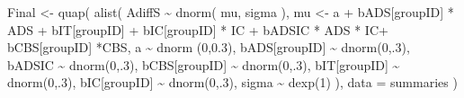 \documentclass[
  10pt,
  dvipsnames,enabledeprecatedfontcommands]{scrartcl}
\newenvironment{Shaded}{\begin{snugshade}}{\end{snugshade}}
\newcommand{\AttributeTok}[1]{\textcolor[rgb]{0.77,0.63,0.00}{#1}}
\newcommand{\DecValTok}[1]{\textcolor[rgb]{0.00,0.00,0.81}{#1}}
\newcommand{\FloatTok}[1]{\textcolor[rgb]{0.00,0.00,0.81}{#1}}
\newcommand{\FunctionTok}[1]{\textcolor[rgb]{0.00,0.00,0.00}{#1}}
\newcommand{\NormalTok}[1]{#1}
\newcommand{\OtherTok}[1]{\textcolor[rgb]{0.56,0.35,0.01}{#1}}
\newcommand{\SpecialCharTok}[1]{\textcolor[rgb]{0.00,0.00,0.00}{#1}}
\begin{document}
\begin{Shaded}
\begin{Highlighting}[]
\NormalTok{Final }\OtherTok{\textless{}{-}} \FunctionTok{quap}\NormalTok{(}
  \FunctionTok{alist}\NormalTok{(}
\NormalTok{    AdiffS }\SpecialCharTok{\textasciitilde{}} \FunctionTok{dnorm}\NormalTok{( mu, sigma ),}
\NormalTok{    mu }\OtherTok{\textless{}{-}}\NormalTok{ a }\SpecialCharTok{+}\NormalTok{ bADS[groupID] }\SpecialCharTok{*}\NormalTok{ ADS }\SpecialCharTok{+}\NormalTok{  bIT[groupID] }\SpecialCharTok{+}\NormalTok{ bIC[groupID] }\SpecialCharTok{*}\NormalTok{ IC }\SpecialCharTok{+} 
\NormalTok{      bADSIC }\SpecialCharTok{*}\NormalTok{ ADS }\SpecialCharTok{*}\NormalTok{ IC}\SpecialCharTok{+}\NormalTok{ bCBS[groupID] }\SpecialCharTok{*}\NormalTok{CBS,}
\NormalTok{    a }\SpecialCharTok{\textasciitilde{}} \FunctionTok{dnorm}\NormalTok{ (}\DecValTok{0}\NormalTok{,}\FloatTok{0.3}\NormalTok{),}
\NormalTok{    bADS[groupID] }\SpecialCharTok{\textasciitilde{}} \FunctionTok{dnorm}\NormalTok{(}\DecValTok{0}\NormalTok{,.}\DecValTok{3}\NormalTok{),}
\NormalTok{    bADSIC }\SpecialCharTok{\textasciitilde{}} \FunctionTok{dnorm}\NormalTok{(}\DecValTok{0}\NormalTok{,.}\DecValTok{3}\NormalTok{),}
\NormalTok{    bCBS[groupID] }\SpecialCharTok{\textasciitilde{}} \FunctionTok{dnorm}\NormalTok{(}\DecValTok{0}\NormalTok{,.}\DecValTok{3}\NormalTok{),}
\NormalTok{    bIT[groupID] }\SpecialCharTok{\textasciitilde{}} \FunctionTok{dnorm}\NormalTok{(}\DecValTok{0}\NormalTok{,.}\DecValTok{3}\NormalTok{),}
\NormalTok{    bIC[groupID] }\SpecialCharTok{\textasciitilde{}} \FunctionTok{dnorm}\NormalTok{(}\DecValTok{0}\NormalTok{,.}\DecValTok{3}\NormalTok{),}
\NormalTok{    sigma  }\SpecialCharTok{\textasciitilde{}} \FunctionTok{dexp}\NormalTok{(}\DecValTok{1}\NormalTok{)}
\NormalTok{  ), }
  \AttributeTok{data =}\NormalTok{ summaries}
\NormalTok{)}




\end{Highlighting}
\end{Shaded}
\end{document}
